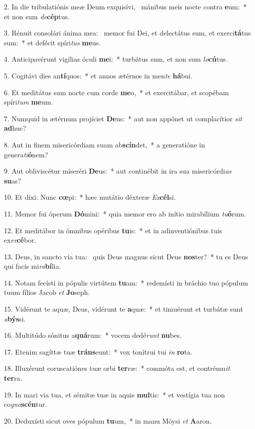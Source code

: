 2. In die tribulatiónis meæ Deum exquisívi, \dag\  mánibus meis nocte contra \textbf{e}um:~*  et non sum \textit{de}\textbf{cép}tus.\

3. Rénuit consolári ánima mea: \dag\  memor fui Dei, et delectátus sum, et exerci\textbf{tá}tus sum:~*  et defécit spíri\textit{tus} \textbf{me}us.\

4. Anticipavérunt vigílias óculi \textbf{me}i:~*  turbátus sum, et non sum \textit{lo}\textbf{cú}tus.\

5. Cogitávi dies an\textbf{tí}quos:~*  et annos ætérnos in men\textit{te} \textbf{há}bui.\

6. Et meditátus sum nocte cum corde \textbf{me}o,~*  et exercitábar, et scopébam spíri\textit{tum} \textbf{me}um.\

7. Numquid in ætérnum projíciet \textbf{De}us:~*  aut non appónet ut complacítior \textit{sit} \textbf{ad}huc?\

8. Aut in finem misericórdiam suam ab\textbf{scín}det,~*  a generatióne in genera\textit{ti}\textbf{ó}nem?\

9. Aut obliviscétur miseréri \textbf{De}us:~*  aut continébit in ira sua misericórdi\textit{as} \textbf{su}as?\

10. Et dixi: Nunc \textbf{cœ}pi:~*  hæc mutátio déxteræ \textit{Ex}\textbf{cél}si.\

11. Memor fui óperum \textbf{Dó}mini:~*  quia memor ero ab inítio mirabílium \textit{tu}\textbf{ó}rum.\

12. Et meditábor in ómnibus opéribus \textbf{tu}is:~*  et in adinventiónibus tuis ex\textit{er}\textbf{cé}bor.\

13. Deus, in sancto via tua: \dag\  quis Deus magnus sicut Deus \textbf{nos}ter?~*  tu es Deus qui facis mi\textit{ra}\textbf{bí}lia.\

14. Notam fecísti in pópulis virtútem \textbf{tu}am:~*  redemísti in bráchio tuo pópulum tuum fílios Jacob \textit{et} \textbf{Jo}seph.\

15. Vidérunt te aquæ, Deus, vidérunt te \textbf{a}quæ:~*  et timuérunt et turbátæ sunt \textit{a}\textbf{býs}si.\

16. Multitúdo sónitus a\textbf{quá}rum:~*  vocem dedé\textit{runt} \textbf{nu}bes.\

17. Etenim sagíttæ tuæ \textbf{tráns}eunt:~*  vox tonítrui tui \textit{in} \textbf{ro}ta.\

18. Illuxérunt coruscatiónes tuæ orbi \textbf{ter}ræ:~*  commóta est, et contrému\textit{it} \textbf{ter}ra.\

19. In mari via tua, et sémitæ tuæ in aquis \textbf{mul}tis:~*  et vestígia tua non co\textit{gno}\textbf{scén}tur.\

20. Deduxísti sicut oves pópulum \textbf{tu}um,~*  in manu Móysi \textit{et} \textbf{A}aron.\

